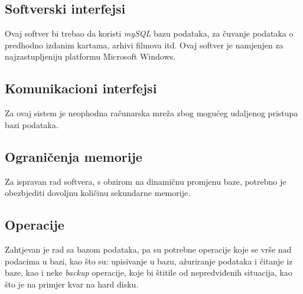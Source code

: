 \subsection{Softverski interfejsi}
Ovaj softver bi trebao da koristi \textit{mySQL} bazu podataka, za čuvanje podataka o predhodno izdanim kartama, arhivi filmova itd. Ovaj softver je namjenjen za najzastupljeniju platformu Microsoft  Windows.

\subsection{Komunikacioni interfejsi} 
Za ovaj sistem je neophodna računarska mreža zbog mogućeg udaljenog pristupa bazi podataka.

\subsection{Ograničenja memorije}
Za ispravan rad softvera, s obzirom na dinamičnu promjenu baze, potrebno je obezbjediti dovoljnu količinu sekundarne memorije.

\subsection{Operacije}
Zahtjevan je rad sa bazom podataka, pa su potrebne operacije
koje se vrše nad podacima u bazi, kao što su: upisivanje u bazu,
ažuriranje podataka i čitanje iz baze, kao i neke \textit{backup} operacije, koje bi
štitile od nepredviđenih situacija, kao što je na primjer kvar na hard disku.


